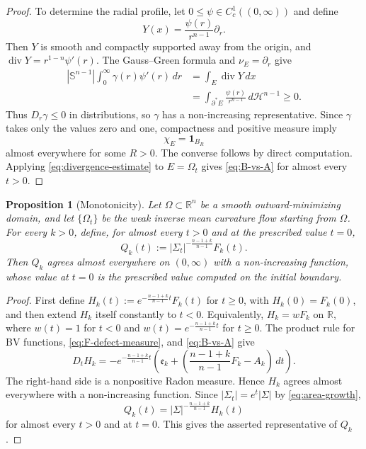 \documentclass[11pt,reqno]{amsart}
\numberwithin{equation}{section}
\newtheorem{proposition}[theorem]{Proposition}
\theoremstyle{definition}
\newcommand{\R}{\mathbb R}
\newcommand{\Sn}{\mathbb S}
\newcommand{\Om}{\Omega}
\newcommand{\Sig}{\Sigma}
\newcommand{\calH}{\mathcal H}
\newcommand{\diver}{\operatorname{div}}
\begin{document}
\begin{proof}
To determine the radial profile, let $0\leq\psi\in C_c^1((0,\infty))$ and define
\begin{equation*}
    Y(x)=\frac{\psi(r)}{r^{n-1}}\partial_r.
\end{equation*}
Then $Y$ is smooth and compactly supported away from the origin, and $\diver Y=r^{1-n}\psi'(r)$.  The Gauss--Green formula and $\nu_E=\partial_r$ give
\begin{align*}
    |\Sn^{n-1}|\int_0^\infty \gamma(r)\psi'(r)\,dr
    &=\int_E\diver Y\,dx\\
    &=\int_{\partial^*E}\frac{\psi(r)}{r^{n-1}}\,d\calH^{n-1}\geq0.
\end{align*}
Thus $D_r\gamma\leq0$ in distributions, so $\gamma$ has a non-increasing representative.  Since $\gamma$ takes only the values zero and one, compactness and positive measure imply
\begin{equation*}
    \chi_E=\mathbf 1_{B_R}
\end{equation*}
almost everywhere for some $R>0$.  The converse follows by direct computation.  Applying \eqref{eq:divergence-estimate} to $E=\Om_t$ gives \eqref{eq:B-vs-A} for almost every $t>0$.
\end{proof}

\begin{proposition}[Monotonicity]\label{prop:monotonicity}
Let $\Om\subset\R^n$ be a smooth outward-minimizing domain, and let $\{\Om_t\}$ be the weak inverse mean curvature flow starting from $\Om$. For every $k>0$, define, for almost every $t>0$ and at the prescribed value $t=0$,
\begin{equation*}
    Q_k(t):=|\Sig_t|^{-\frac{n-1+k}{n-1}}F_k(t).
\end{equation*}
Then $Q_k$ agrees almost everywhere on $(0,\infty)$ with a non-increasing function, whose value at $t=0$ is the prescribed value computed on the initial boundary.
\end{proposition}

\begin{proof}
First define $H_k(t):=e^{-\frac{n-1+k}{n-1} t}F_k(t)$ for $t\geq0$, with $H_k(0)=F_k(0)$, and then extend $H_k$ itself constantly to $t<0$. Equivalently, $H_k=wF_k$ on $\mathbb R$, where $w(t)=1$ for $t<0$ and $w(t)=e^{-\frac{n-1+k}{n-1} t}$ for $t\geq0$. The product rule for BV functions, \eqref{eq:F-defect-measure}, and \eqref{eq:B-vs-A} give
\begin{equation}\label{eq:Q-defect}
    D_tH_k
    =-e^{-\frac{n-1+k}{n-1} t}\left(
      \mathfrak e_k+\left(\frac{n-1+k}{n-1} F_k-A_k\right)\,dt\right).
\end{equation}
The right-hand side is a nonpositive Radon measure. Hence $H_k$ agrees almost everywhere with a non-increasing function. Since $|\Sig_t|=e^t|\Sig|$ by \eqref{eq:area-growth},
\begin{equation*}
    Q_k(t)=|\Sig|^{-\frac{n-1+k}{n-1}}H_k(t)
\end{equation*}
for almost every $t>0$ and at $t=0$.  This gives the asserted representative of $Q_k$.
\end{proof}
\end{document}

